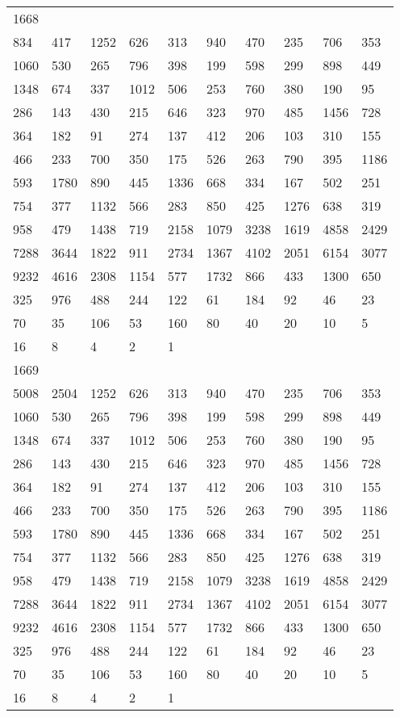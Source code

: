 \begin{longtable}{*{10}{l}}
1668&&&&&&&&&\\
834& 417& 1252& 626& 313& 940& 470& 235& 706& 353\\
1060& 530& 265& 796& 398& 199& 598& 299& 898& 449\\
1348& 674& 337& 1012& 506& 253& 760& 380& 190& 95\\
286& 143& 430& 215& 646& 323& 970& 485& 1456& 728\\
364& 182& 91& 274& 137& 412& 206& 103& 310& 155\\
466& 233& 700& 350& 175& 526& 263& 790& 395& 1186\\
593& 1780& 890& 445& 1336& 668& 334& 167& 502& 251\\
754& 377& 1132& 566& 283& 850& 425& 1276& 638& 319\\
958& 479& 1438& 719& 2158& 1079& 3238& 1619& 4858& 2429\\
7288& 3644& 1822& 911& 2734& 1367& 4102& 2051& 6154& 3077\\
9232& 4616& 2308& 1154& 577& 1732& 866& 433& 1300& 650\\
325& 976& 488& 244& 122& 61& 184& 92& 46& 23\\
70& 35& 106& 53& 160& 80& 40& 20& 10& 5\\
16& 8& 4& 2& 1& \\

1669&&&&&&&&&\\
5008& 2504& 1252& 626& 313& 940& 470& 235& 706& 353\\
1060& 530& 265& 796& 398& 199& 598& 299& 898& 449\\
1348& 674& 337& 1012& 506& 253& 760& 380& 190& 95\\
286& 143& 430& 215& 646& 323& 970& 485& 1456& 728\\
364& 182& 91& 274& 137& 412& 206& 103& 310& 155\\
466& 233& 700& 350& 175& 526& 263& 790& 395& 1186\\
593& 1780& 890& 445& 1336& 668& 334& 167& 502& 251\\
754& 377& 1132& 566& 283& 850& 425& 1276& 638& 319\\
958& 479& 1438& 719& 2158& 1079& 3238& 1619& 4858& 2429\\
7288& 3644& 1822& 911& 2734& 1367& 4102& 2051& 6154& 3077\\
9232& 4616& 2308& 1154& 577& 1732& 866& 433& 1300& 650\\
325& 976& 488& 244& 122& 61& 184& 92& 46& 23\\
70& 35& 106& 53& 160& 80& 40& 20& 10& 5\\
16& 8& 4& 2& 1& \\


\end{longtable}
